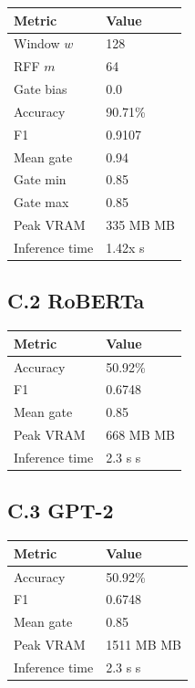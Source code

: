 \begin{table}[H]
\centering
\small
\begin{tabular}{ll}
\toprule
\textbf{Metric} & \textbf{Value} \\
\midrule
Window $w$ & 128 \\
RFF $m$ & 64 \\
Gate bias & 0.0 \\
Accuracy & 90.71\% \\
F1 & 0.9107 \\
Mean gate & 0.94 \\
Gate min & 0.85 \\
Gate max & 0.85 \\
Peak VRAM & 335 MB MB \\
Inference time & 1.42x s \\
\bottomrule
\end{tabular}
\end{table}

\subsection{C.2 RoBERTa}

\begin{table}[H]
\centering
\small
\begin{tabular}{ll}
\toprule
\textbf{Metric} & \textbf{Value} \\
\midrule
Accuracy & 50.92\% \\
F1 & 0.6748 \\
Mean gate & 0.85 \\
Peak VRAM & 668 MB MB \\
Inference time & 2.3 s s \\
\bottomrule
\end{tabular}
\end{table}

\subsection{C.3 GPT-2}

\begin{table}[H]
\centering
\small
\begin{tabular}{ll}
\toprule
\textbf{Metric} & \textbf{Value} \\
\midrule
Accuracy & 50.92\% \\
F1 & 0.6748 \\
Mean gate & 0.85 \\
Peak VRAM & 1511 MB MB \\
Inference time & 2.3 s s \\
\bottomrule
\end{tabular}
\end{table}

